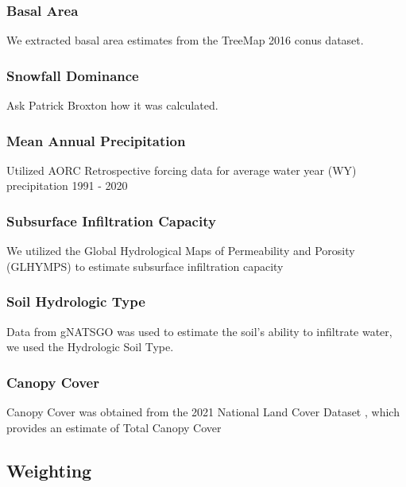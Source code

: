 \documentclass[
  number]{elsarticle}
\begin{document}
\subsubsection{Basal Area}\label{basal-area}

We extracted basal area estimates from the TreeMap 2016
\citep{riley2022} conus dataset.

\subsubsection{Snowfall Dominance}\label{snowfall-dominance}

Ask Patrick Broxton how it was calculated.

\subsubsection{Mean Annual
Precipitation}\label{mean-annual-precipitation}

Utilized AORC Retrospective forcing data for average water year (WY)
precipitation 1991 - 2020

\subsubsection{Subsurface Infiltration
Capacity}\label{subsurface-infiltration-capacity}

We utilized the Global Hydrological Maps of Permeability and Porosity
(GLHYMPS) to estimate subsurface infiltration capacity
\citep{gleeson2014}

\subsubsection{Soil Hydrologic Type}\label{soil-hydrologic-type}

Data from gNATSGO was used to estimate the soil's ability to infiltrate
water, we used the Hydrologic Soil Type.

\subsubsection{Canopy Cover}\label{canopy-cover}

Canopy Cover was obtained from the 2021 National Land Cover Dataset ,
which provides an estimate of Total Canopy Cover

\subsection{Weighting}\label{weighting}
\end{document}
